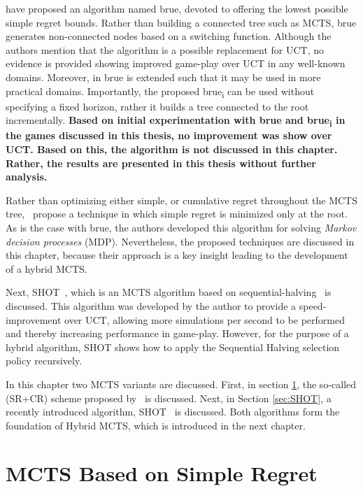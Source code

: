 \documentclass{kecsmstr}
\newcommand{\TODO}[1]{\textbf{\color{red}#1}}
\begin{document}
 have proposed an algorithm named {\sc brue}, devoted to offering the lowest possible simple regret bounds. Rather than building a connected tree such as MCTS, {\sc brue} generates non-connected nodes based on a switching function. Although the authors mention that the algorithm is a possible replacement for UCT, no evidence is provided showing improved game-play over UCT in any well-known domains. Moreover, in  {\sc brue} is extended such that it may be used in more practical domains. Importantly, the proposed {\sc brue\textsubscript{i}} can be used without specifying a fixed horizon, rather it builds a tree connected to the root incrementally. \TODO{Based on initial experimentation with {\sc brue} and {\sc brue\textsubscript{i}} in the games discussed in this thesis, no improvement was show over UCT. Based on this, the algorithm is not discussed in this chapter. Rather, the results are presented in this thesis without further analysis.}

Rather than optimizing either simple, or cumulative regret throughout the MCTS tree,~ propose a technique in which simple regret is minimized only at the root. As is the case with {\sc brue}, the authors developed this algorithm for solving \emph{Markov decision processes} (MDP). Nevertheless, the proposed techniques are discussed in this chapter, because their approach is a key insight leading to the development of a hybrid MCTS.

Next, SHOT~, which is an MCTS algorithm based on sequential-halving~ is discussed. This algorithm was developed by the author to provide a speed-improvement over UCT, allowing more simulations per second to be performed and thereby increasing performance in game-play. However, for the purpose of a hybrid algorithm, SHOT shows how to apply the Sequential Halving selection policy recursively.

\vspace{2 mm}
In this chapter two MCTS variants are discussed. First, in section \ref{sec:srmcts}, the so-called (SR+CR) scheme proposed by~ is discussed. Next, in Section \ref{sec:SHOT}, a recently introduced algorithm, SHOT~ is discussed. Both algorithms form the foundation of Hybrid MCTS, which is introduced in the next chapter.

\section{MCTS Based on Simple Regret}
\label{sec:srmcts}
\end{document}
